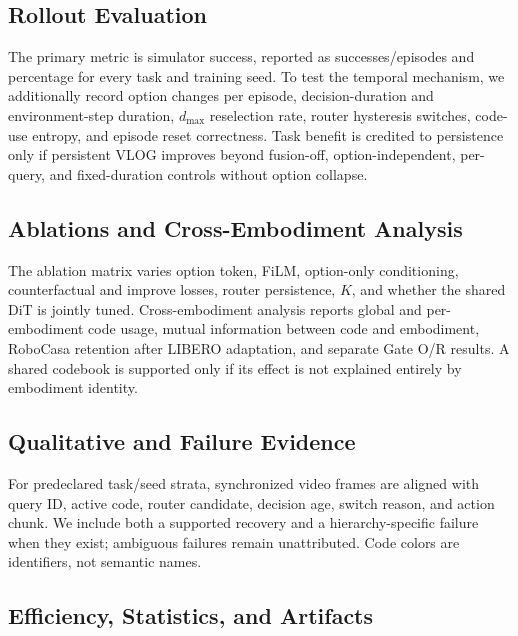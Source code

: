 \subsection{Rollout Evaluation}

The primary metric is simulator success, reported as successes/episodes and
percentage for every task and training seed.  To test the temporal mechanism,
we additionally record option changes per episode, decision-duration and
environment-step duration, \(d_{\max}\) reselection rate, router hysteresis
switches, code-use entropy, and episode reset correctness.  Task benefit is
credited to persistence only if persistent VLOG improves beyond fusion-off,
option-independent, per-query, and fixed-duration controls without option
collapse.



\subsection{Ablations and Cross-Embodiment Analysis}

The ablation matrix varies option token, FiLM, option-only conditioning,
counterfactual and improve losses, router persistence, \(K\), and whether the
shared DiT is jointly tuned.  Cross-embodiment analysis reports global and
per-embodiment code usage, mutual information between code and embodiment,
RoboCasa retention after LIBERO adaptation, and separate Gate O/R results.
A shared codebook is supported only if its effect is not explained entirely by
embodiment identity.



\subsection{Qualitative and Failure Evidence}

For predeclared task/seed strata, synchronized video frames are aligned with
query ID, active code, router candidate, decision age, switch reason, and action
chunk.  We include both a supported recovery and a hierarchy-specific failure
when they exist; ambiguous failures remain unattributed.  Code colors are
identifiers, not semantic names.



\subsection{Efficiency, Statistics, and Artifacts}


